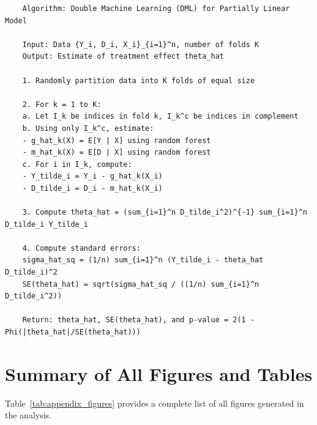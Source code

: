 \begin{verbatim}
	Algorithm: Double Machine Learning (DML) for Partially Linear Model
	
	Input: Data {Y_i, D_i, X_i}_{i=1}^n, number of folds K
	Output: Estimate of treatment effect theta_hat
	
	1. Randomly partition data into K folds of equal size
	
	2. For k = 1 to K:
	a. Let I_k be indices in fold k, I_k^c be indices in complement
	b. Using only I_k^c, estimate:
	- g_hat_k(X) = E[Y | X] using random forest
	- m_hat_k(X) = E[D | X] using random forest
	c. For i in I_k, compute:
	- Y_tilde_i = Y_i - g_hat_k(X_i)
	- D_tilde_i = D_i - m_hat_k(X_i)
	
	3. Compute theta_hat = (sum_{i=1}^n D_tilde_i^2)^{-1} sum_{i=1}^n D_tilde_i Y_tilde_i
	
	4. Compute standard errors:
	sigma_hat_sq = (1/n) sum_{i=1}^n (Y_tilde_i - theta_hat D_tilde_i)^2
	SE(theta_hat) = sqrt(sigma_hat_sq / ((1/n) sum_{i=1}^n D_tilde_i^2))
	
	Return: theta_hat, SE(theta_hat), and p-value = 2(1 - Phi(|theta_hat|/SE(theta_hat)))
\end{verbatim}

\section{Summary of All Figures and Tables}

Table~\ref{tab:appendix_figures} provides a complete list of all figures generated in the analysis.

